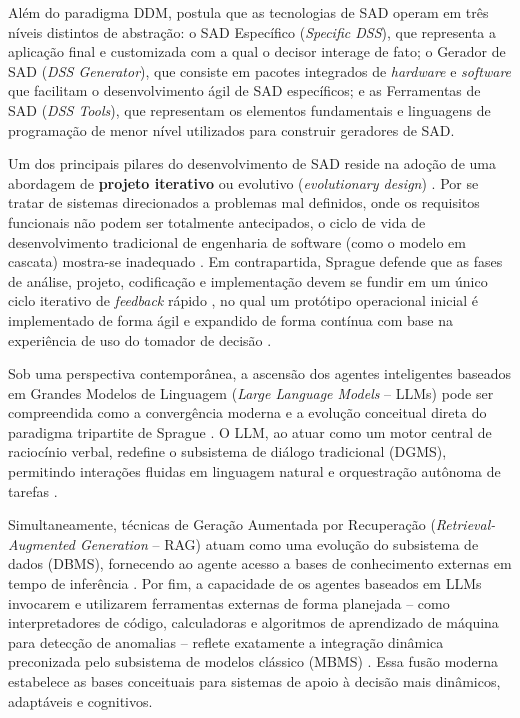 Além do paradigma DDM,  postula que as tecnologias de SAD operam em três níveis distintos de abstração: o SAD Específico (\textit{Specific DSS}), que representa a aplicação final e customizada com a qual o decisor interage de fato; o Gerador de SAD (\textit{DSS Generator}), que consiste em pacotes integrados de \textit{hardware} e \textit{software} que facilitam o desenvolvimento ágil de SAD específicos; e as Ferramentas de SAD (\textit{DSS Tools}), que representam os elementos fundamentais e linguagens de programação de menor nível utilizados para construir geradores de SAD.

Um dos principais pilares do desenvolvimento de SAD reside na adoção de uma abordagem de \textbf{projeto iterativo} ou evolutivo (\textit{evolutionary design}) \cite{sprague1980framework}. Por se tratar de sistemas direcionados a problemas mal definidos, onde os requisitos funcionais não podem ser totalmente antecipados, o ciclo de vida de desenvolvimento tradicional de engenharia de software (como o modelo em cascata) mostra-se inadequado \cite{sprague1980framework}. Em contrapartida, Sprague defende que as fases de análise, projeto, codificação e implementação devem se fundir em um único ciclo iterativo de \textit{feedback} rápido \cite{sprague1980framework}, no qual um protótipo operacional inicial é implementado de forma ágil e expandido de forma contínua com base na experiência de uso do tomador de decisão \cite{sprague1980framework}.

Sob uma perspectiva contemporânea, a ascensão dos agentes inteligentes baseados em Grandes Modelos de Linguagem (\textit{Large Language Models} -- LLMs) pode ser compreendida como a convergência moderna e a evolução conceitual direta do paradigma tripartite de Sprague \cite{sprague1980framework, cheng2026, zhao2023survey}. O LLM, ao atuar como um motor central de raciocínio verbal, redefine o subsistema de diálogo tradicional (DGMS), permitindo interações fluidas em linguagem natural e orquestração autônoma de tarefas \cite{cheng2026, zhao2023survey}. 

Simultaneamente, técnicas de Geração Aumentada por Recuperação (\textit{Retrieval-Augmented Generation} -- RAG) atuam como uma evolução do subsistema de dados (DBMS), fornecendo ao agente acesso a bases de conhecimento externas em tempo de inferência \cite{zhao2023survey, lewis2020rag}. Por fim, a capacidade de os agentes baseados em LLMs invocarem e utilizarem ferramentas externas de forma planejada -- como interpretadores de código, calculadoras e algoritmos de aprendizado de máquina para detecção de anomalias -- reflete exatamente a integração dinâmica preconizada pelo subsistema de modelos clássico (MBMS) \cite{cheng2026, zhao2023survey}. Essa fusão moderna estabelece as bases conceituais para sistemas de apoio à decisão mais dinâmicos, adaptáveis e cognitivos.


